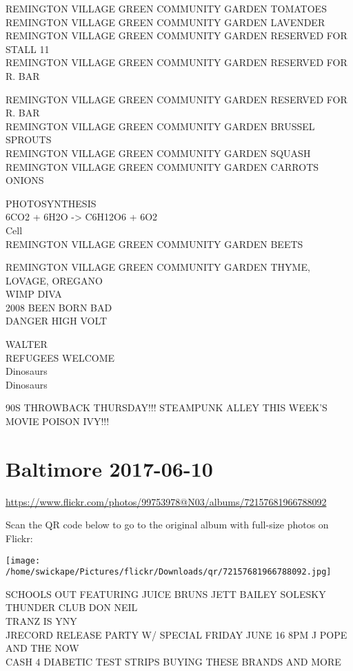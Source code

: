 \documentclass[10pt,letterpaper]{article}
\begin{document}
REMINGTON VILLAGE GREEN COMMUNITY GARDEN TOMATOES\\
REMINGTON VILLAGE GREEN COMMUNITY GARDEN LAVENDER\\
REMINGTON VILLAGE GREEN COMMUNITY GARDEN RESERVED FOR STALL 11\\
REMINGTON VILLAGE GREEN COMMUNITY GARDEN RESERVED FOR R. BAR

REMINGTON VILLAGE GREEN COMMUNITY GARDEN RESERVED FOR R. BAR\\
REMINGTON VILLAGE GREEN COMMUNITY GARDEN BRUSSEL SPROUTS\\
REMINGTON VILLAGE GREEN COMMUNITY GARDEN SQUASH\\
REMINGTON VILLAGE GREEN COMMUNITY GARDEN CARROTS ONIONS

PHOTOSYNTHESIS\\
6CO2 + 6H2O {-}> C6H12O6 + 6O2\\
Cell\\
REMINGTON VILLAGE GREEN COMMUNITY GARDEN BEETS

REMINGTON VILLAGE GREEN COMMUNITY GARDEN THYME, LOVAGE, OREGANO\\
WIMP DIVA\\
2008 BEEN BORN BAD\\
DANGER HIGH VOLT

WALTER\\
REFUGEES WELCOME\\
Dinosaurs\\
Dinosaurs

90S THROWBACK THURSDAY!!! STEAMPUNK ALLEY THIS WEEK'S MOVIE POISON IVY!!!


\section*{Baltimore 2017-06-10}

\url{https://www.flickr.com/photos/99753978@N03/albums/72157681966788092}

Scan the QR code below to go to the original album with full-size photos on Flickr:

\texttt{[image: /home/swickape/Pictures/flickr/Downloads/qr/72157681966788092.jpg]}


SCHOOLS OUT FEATURING JUICE BRUNS JETT BAILEY SOLESKY THUNDER CLUB DON NEIL\\
TRANZ IS YNY\\
JRECORD RELEASE PARTY W/ SPECIAL FRIDAY JUNE 16 8PM J POPE AND THE NOW\\
CASH 4 DIABETIC TEST STRIPS BUYING THESE BRANDS AND MORE
\end{document}

